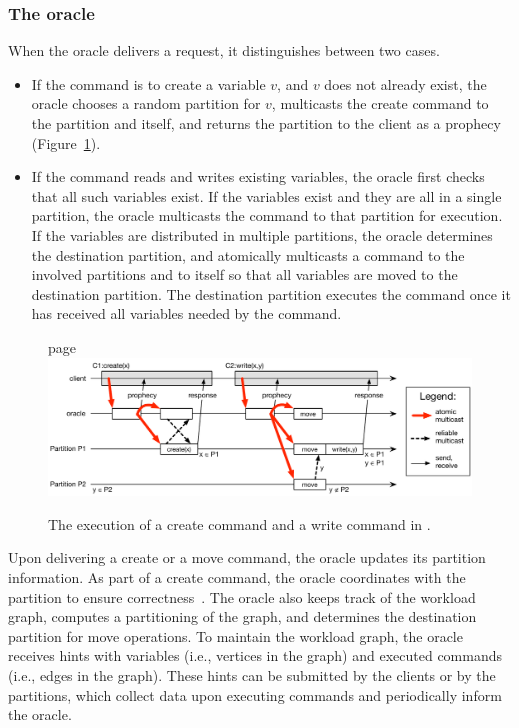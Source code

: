 \subsubsection{The oracle}
\label{sec:dynastar-oracle}
When the oracle delivers a request, it distinguishes between two cases.
\begin{itemize}
\item If the command is to create a variable $v$, and $v$ does not already
exist, the oracle chooses a random partition for $v$, multicasts the create
command to the partition and itself, and returns the partition to the client as
a prophecy (Figure~\ref{fig:oracle_repartition}).
\item If the command reads and writes existing variables, the oracle first
checks that all such variables exist. If the variables exist and they are all in
a single partition, the oracle multicasts the command to that partition for
execution. If the variables are distributed in multiple partitions, the oracle
determines the destination partition, and atomically multicasts a command to the
involved partitions and to itself so that all variables are moved to the
destination partition. The destination partition executes the command once it
has received all variables needed by the command.
\end{itemize}

% 
% 
% 

\begin{figure}
\begin{minipage}[b]{1\linewidth} %
page
\centering
      \includegraphics[width=0.9\linewidth]{figures/dynastar}
\end{minipage}
\caption{The execution of a create command and a write command in \dynastar.}
\label{fig:oracle_repartition}
\end{figure}

Upon delivering a create or a move command, the oracle updates its partition
information. As part of a create command, the oracle coordinates with the
partition to ensure correctness~\cite{bezerra2014ssmr}.
%
The oracle also keeps track of the workload graph, computes a partitioning of
the graph, and determines the destination partition for move operations. To
maintain the workload graph, the oracle receives hints with variables (i.e.,
vertices in the graph) and executed commands (i.e., edges in the graph). These
hints can be submitted by the clients or by the partitions, which collect data
upon executing commands and periodically inform the oracle.

